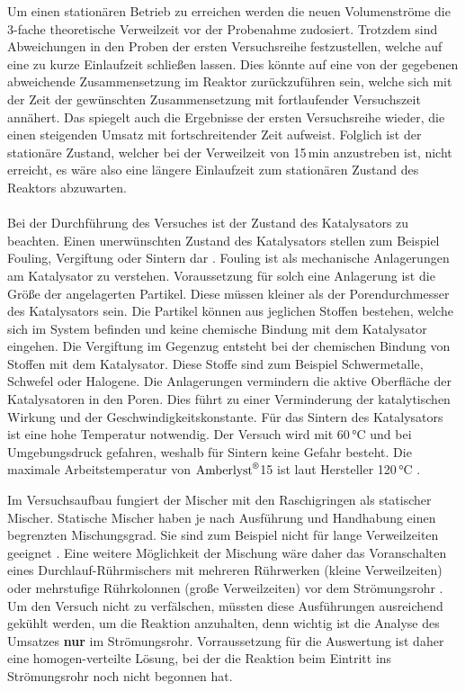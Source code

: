 \documentclass[12pt,liststotoc]{report}
\begin{document}
Um einen stationären Betrieb zu erreichen werden die neuen Volumenströme die 3-fache theoretische Verweilzeit vor der Probenahme  zudosiert. Trotzdem sind Abweichungen in den Proben der ersten Versuchsreihe festzustellen, welche auf eine zu kurze Einlaufzeit schließen lassen. Dies könnte auf eine von der gegebenen abweichende Zusammensetzung im Reaktor zurückzuführen sein, welche sich mit der Zeit der gewünschten Zusammensetzung mit fortlaufender Versuchszeit annähert. Das spiegelt auch die Ergebnisse der ersten Versuchsreihe wieder, die einen steigenden Umsatz mit fortschreitender Zeit aufweist. Folglich ist der stationäre Zustand, welcher bei der Verweilzeit von 15\,min anzustreben ist, nicht erreicht, es wäre also eine längere Einlaufzeit zum stationären Zustand des Reaktors abzuwarten.
\\
\\
Bei der Durchführung des Versuches ist der Zustand des Katalysators zu beachten. Einen unerwünschten Zustand des Katalysators stellen zum Beispiel Fouling, Vergiftung oder Sintern dar \cite{mortimer2007chemie}. Fouling ist als mechanische Anlagerungen am Katalysator zu verstehen. Voraussetzung für solch eine Anlagerung ist die Größe der angelagerten Partikel. Diese müssen kleiner als der Porendurchmesser des Katalysators sein. Die Partikel können aus jeglichen Stoffen bestehen, welche sich im System befinden und keine chemische Bindung mit dem Katalysator eingehen. Die Vergiftung im Gegenzug entsteht bei der chemischen Bindung von Stoffen mit dem Katalysator. Diese Stoffe sind zum Beispiel Schwermetalle, Schwefel oder Halogene. Die Anlagerungen vermindern die aktive Oberfläche der Katalysatoren in den Poren. Dies führt zu einer Verminderung der katalytischen Wirkung und der Geschwindigkeitskonstante. Für das Sintern des Katalysators ist eine hohe Temperatur notwendig. Der Versuch wird mit 60\,°C und bei Umgebungsdruck gefahren, weshalb für Sintern keine Gefahr besteht. Die maximale Arbeitstemperatur von $\text{Amberlyst}^\text{\textregistered}$15 ist laut Hersteller 120\,°C \cite{Amberlyst_Stoffdaten}.\newline

Im Versuchsaufbau fungiert der Mischer mit den Raschigringen als statischer Mischer. Statische Mischer haben je nach Ausführung und Handhabung einen begrenzten Mischungsgrad. Sie sind zum Beispiel nicht für lange Verweilzeiten geeignet \cite{zogg1993einfuhrung}. Eine weitere Möglichkeit der Mischung wäre daher das Voranschalten eines Durchlauf-Rührmischers mit mehreren Rührwerken (kleine Verweilzeiten) oder mehrstufige Rührkolonnen (große Verweilzeiten) vor dem Strömungsrohr \cite{zogg1993einfuhrung}. Um den Versuch nicht zu verfälschen, müssten diese Ausführungen ausreichend gekühlt werden, um die Reaktion anzuhalten, denn wichtig ist die Analyse des Umsatzes \textbf{nur} im Strömungsrohr. Vorraussetzung für die Auswertung ist daher eine homogen-verteilte Lösung, bei der die Reaktion beim Eintritt ins Strömungsrohr noch nicht begonnen hat.
\end{document}

